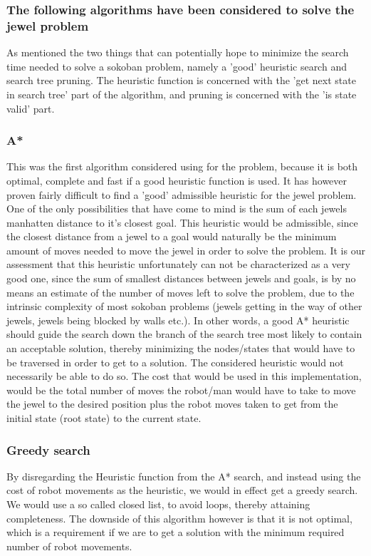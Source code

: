 \subsubsection*{The following algorithms have been considered to solve the jewel problem}
As mentioned the two things that can potentially hope to minimize the search time needed to solve a sokoban problem, namely a 'good' heuristic search and search tree pruning. The heuristic function is concerned with the 'get next state in search tree' part of the algorithm, and pruning is concerned with the 'is state valid' part.

\subsubsection*{A*}
This was the first algorithm considered using for the problem, because it is both optimal, complete and fast if a good heuristic function is used.
It has however proven fairly difficult to find a 'good' admissible heuristic for the jewel problem. One of the only possibilities that have come to mind is the sum of each jewels manhatten distance to it's closest goal. This heuristic would be admissible, since the closest distance from a jewel to a goal would naturally be the minimum amount of moves needed to move the jewel in order to solve the problem. It is our assessment that this heuristic unfortunately can not be characterized as a very good one, since the sum of smallest distances between jewels and goals, is by no means an estimate of the number of moves left to solve the problem, due to the intrinsic complexity of most sokoban problems (jewels getting in the way of other jewels, jewels being blocked by walls etc.). In other words, a good A* heuristic should guide the search down the branch of the search tree most likely to contain an acceptable solution, thereby minimizing the nodes/states that would have to be traversed in order to get to a solution. The considered heuristic would not necessarily be able to do so.
The cost that would be used in this implementation, would be the total number of moves the robot/man would have to take to move the jewel to the desired position plus the robot moves taken to get from the initial state (root state) to the current state.

\subsubsection*{Greedy search}
By disregarding the Heuristic function from the A* search, and instead using the cost of robot movements as the heuristic, we would in effect get a greedy search. We would use a so called closed list, to avoid loops, thereby attaining completeness. The downside of this algorithm however is that it is not optimal, which is a requirement if we are to get a solution with the minimum required number of robot movements.


